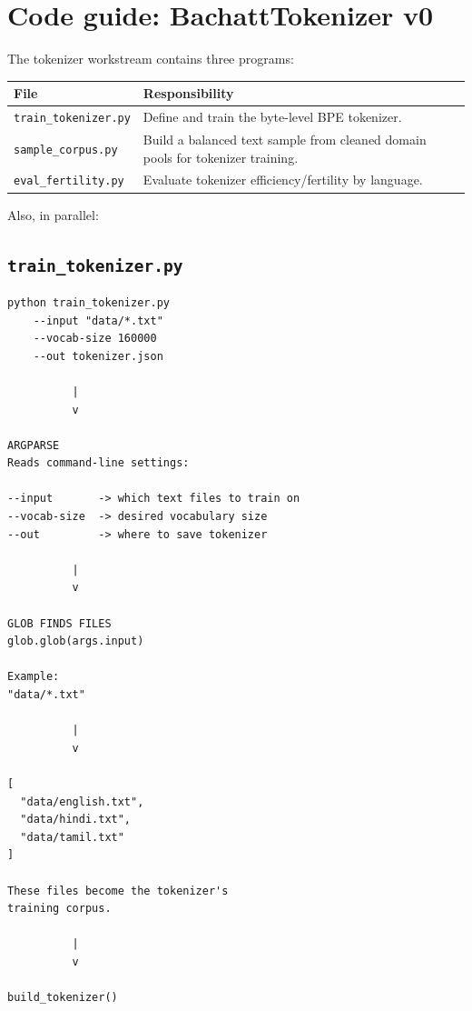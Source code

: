 \clearpage
\section{Code guide: BachattTokenizer v0}

The tokenizer workstream contains three programs:

\renewcommand{\arraystretch}{1.2}
\begin{tabular}{@{}p{}p{}@{}}
  \textbf{File} & \textbf{Responsibility} \\
  \hline
  \texttt{train\_tokenizer.py} & Define and train the byte-level
  BPE tokenizer. \\
  \texttt{sample\_corpus.py} & Build a balanced text sample from cleaned
  domain pools for tokenizer training. \\
  \texttt{eval\_fertility.py} & Evaluate tokenizer efficiency/fertility
  by language. \\
\end{tabular}

Also, in parallel:
\renewcommand{\arraystretch}{1.2}

\subsection{\texttt{train\_tokenizer.py}}

\begin{lstlisting}[style=shadedpython,language={},basicstyle=\scriptsize\ttfamily,breaklines=true]
python train_tokenizer.py
    --input "data/*.txt"
    --vocab-size 160000
    --out tokenizer.json

          |
          v

ARGPARSE
Reads command-line settings:

--input       -> which text files to train on
--vocab-size  -> desired vocabulary size
--out         -> where to save tokenizer

          |
          v

GLOB FINDS FILES
glob.glob(args.input)

Example:
"data/*.txt"

          |
          v

[
  "data/english.txt",
  "data/hindi.txt",
  "data/tamil.txt"
]

These files become the tokenizer's
training corpus.

          |
          v

build_tokenizer()

\end{lstlisting}

